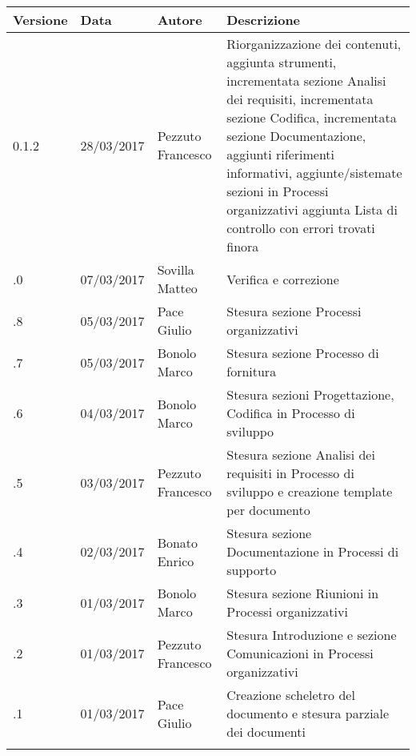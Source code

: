 	\newpage
		\begin{longtabu} to \textwidth {
				X[4,l,p]
				X[4,l,p]
				X[4,l,p]
				X[8,l,p]}
			\toprule
			 Versione & Data & Autore & Descrizione \\
			\midrule
			\endhead
					0.1.2 & 28/03/2017 & Pezzuto Francesco & Riorganizzazione dei contenuti, aggiunta strumenti, incrementata sezione Analisi dei requisiti, incrementata sezione Codifica, incrementata sezione Documentazione, aggiunti riferimenti informativi, aggiunte/sistemate sezioni in Processi organizzativi aggiunta Lista di controllo con errori trovati finora\\
					\addlinespace[0.2em]
					\midrule
					.0 & 07/03/2017 & Sovilla Matteo & Verifica e correzione\\
\addlinespace[0.2em]
\midrule
{}.8 & 05/03/2017 & Pace Giulio & Stesura sezione Processi organizzativi\\
\addlinespace[0.2em]
\midrule
{}.7 & 05/03/2017 & Bonolo Marco & Stesura sezione Processo di fornitura\\
\addlinespace[0.2em]
\midrule
{}.6 & 04/03/2017 & Bonolo Marco & Stesura sezioni Progettazione, Codifica in Processo di sviluppo\\
\addlinespace[0.2em]
\midrule
{}.5 & 03/03/2017 & Pezzuto Francesco & Stesura sezione Analisi dei requisiti in Processo di sviluppo e creazione template per documento\\
		\addlinespace[0.2em]
		\midrule
		.4 & 02/03/2017 & Bonato Enrico & Stesura sezione Documentazione in Processi di supporto\\
		\addlinespace[0.2em]
		\midrule
		.3 & 01/03/2017 & Bonolo Marco & Stesura sezione Riunioni in Processi organizzativi\\
		\addlinespace[0.2em]
		\midrule
		.2 & 01/03/2017 & Pezzuto Francesco & Stesura Introduzione e sezione Comunicazioni in Processi organizzativi\\
		\addlinespace[0.2em]
		\midrule
		.1 & 01/03/2017 & Pace Giulio & Creazione scheletro del documento e stesura parziale dei documenti\\
		\addlinespace[0.4em]
		\bottomrule
	\end{longtabu}
